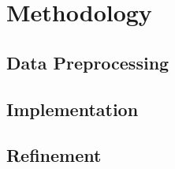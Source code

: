 \documentclass[a4paper,10pt]{article}
\begin{document}
\section{Methodology}

\subsection{Data Preprocessing}
\label{datapreprocessing}

\subsection{Implementation}

\subsection{Refinement}
\end{document}
